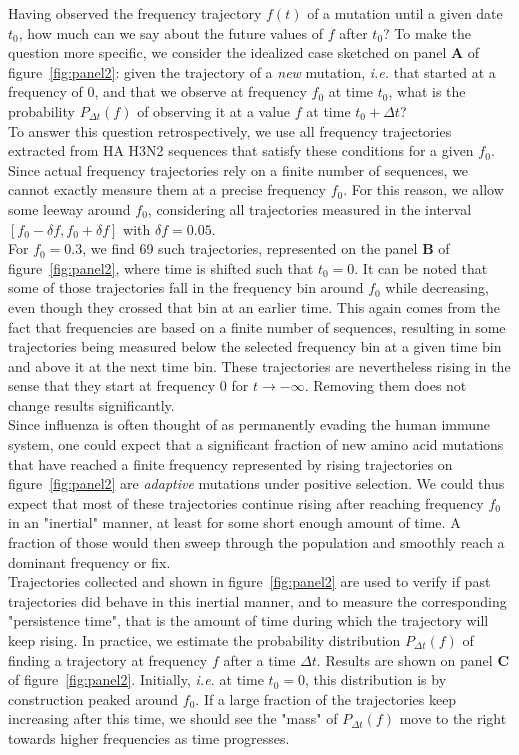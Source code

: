\documentclass{article}
\begin{document}
	Having observed the frequency trajectory $f(t)$ of a mutation until a given date $t_0$, how much can we say about the future values of $f$ after $t_0$? To make the question more specific, we consider the idealized case sketched on panel \textbf{A} of figure~\ref{fig:panel2}: given the trajectory of a \emph{new} mutation, \emph{i.e.} that started at a frequency of 0, and that we observe at frequency $f_0$ at time $t_0$, what is the probability $P_{\Delta t}(f)$ of observing it at a value $f$ at time $t_0 + \Delta t$? \\
	To answer this question retrospectively, we use all frequency trajectories extracted from HA H3N2 sequences that satisfy these conditions for a given $f_0$. Since actual frequency trajectories rely on a finite number of sequences, we cannot exactly measure them at a precise frequency $f_0$. For this reason, we allow some leeway around $f_0$, considering all trajectories measured in the interval $[f_0-\delta f, f_0+\delta f]$ with $\delta f = 0.05$. \\
	For $f_0=0.3$, we find 69 such trajectories, represented on the panel \textbf{B} of figure~\ref{fig:panel2}, where time is shifted such that $t_0 =0$. It can be noted that some of those trajectories fall in the frequency bin around $f_0$ while decreasing, even though they crossed that bin at an earlier time. This again comes from the fact that frequencies are based on a finite number of sequences, resulting in some trajectories being measured below the selected frequency bin at a given time bin and above it at the next time bin. These trajectories are nevertheless rising in the sense that they start at frequency 0 for $t\rightarrow -\infty$. Removing them does not change results significantly. \\
	Since influenza is often thought of as permanently evading the human immune system, one could expect that a significant fraction of new amino acid mutations that have reached a finite frequency represented by rising trajectories on figure~\ref{fig:panel2} are \emph{adaptive} mutations under positive selection. We could thus expect that most of these trajectories continue rising after reaching frequency $f_0$ in an "inertial" manner, at least for some short enough amount of time. A fraction of those would then sweep through the population and smoothly reach a dominant frequency or fix. \\
	Trajectories collected and shown in figure~\ref{fig:panel2} are used to verify if past trajectories did behave in this inertial manner, and to measure the corresponding "persistence time", that is the amount of time during which the trajectory will keep rising. In practice, we  estimate the probability distribution $P_{\Delta t}(f)$ of finding a trajectory at frequency $f$ after a time $\Delta t$. Results are shown on panel \textbf{C} of figure~\ref{fig:panel2}. Initially, \emph{i.e.} at time $t_0=0$, this distribution is by construction peaked around $f_0$. If a large fraction of the trajectories keep increasing after this time, we should see the "mass" of $P_{\Delta t}(f)$ move to the right towards higher frequencies as time progresses.\\
\end{document}
